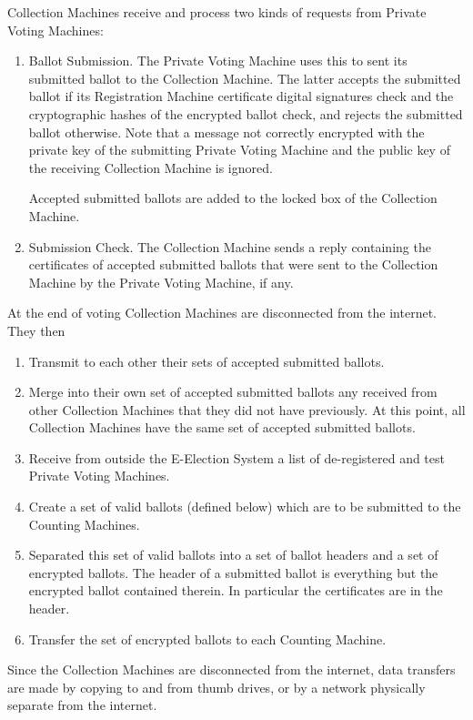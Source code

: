 \documentclass[12pt]{article}
\begin{document}
Collection Machines receive and process two kinds of requests from
Private Voting Machines:
\begin{enumerate}

\item
Ballot Submission.  The Private Voting Machine uses this to sent
its submitted ballot to the Collection Machine.  The latter accepts
the submitted ballot if its Registration Machine certificate
digital signatures check and the cryptographic hashes of the
encrypted ballot check, and rejects the submitted
ballot otherwise.  Note that a message not correctly encrypted with
the private key of the submitting Private Voting Machine and the
public key of the receiving Collection Machine is ignored.

Accepted submitted ballots are added to the locked box of the
Collection Machine.

\item
Submission Check.  The Collection Machine sends a reply containing
the certificates of accepted submitted ballots
that were sent to the Collection Machine
by the Private Voting Machine, if any.

\end{enumerate}

At the end of voting Collection Machines are disconnected from
the internet.  They then
\begin{enumerate}
\item Transmit to each other their sets of accepted submitted ballots.
\item Merge into their own set of accepted submitted ballots any
received from other Collection Machines that they did not have previously.
At this point, all Collection Machines have the same set of accepted
submitted ballots.
\item Receive from outside the E-Election System a list of de-registered
and test Private Voting Machines.
\item Create a set of valid ballots (defined below)
which are to be submitted to the Counting Machines.
\item Separated this set of valid ballots into a set of ballot headers
and a set of encrypted ballots.  The header of a submitted ballot is
everything but the encrypted ballot contained therein.  In particular
the certificates are in the header.
\item Transfer the set of encrypted ballots to each Counting Machine.
\end{enumerate}

Since the Collection Machines are disconnected from the internet,
data transfers are made by copying to and from thumb drives, or by
a network physically separate from the internet.
\end{document}
